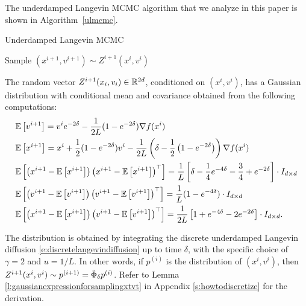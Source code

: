 The underdamped Langevin MCMC algorithm that we analyze in this paper is shown in Algorithm~\ref{ulmcmc}.

\label{algosec}\begin{algorithm}[t] \label{ulmcmc}
\caption{Underdamped Langevin MCMC} 

      {
		  Sample $(x^{i+1},v^{i+1})\sim Z^{i+1}(x^i,v^i)$
        }
   \end{algorithm} 
The random vector $Z^{i+1}(x_i,v_i)\in \mathbb{R}^{2d}$, conditioned on $(x^i,v^i)$, has a Gaussian distribution with conditional mean and covariance obtained from the following computations:
   \begin{align*}
&\mathbb{E}\left[v^{i+1}\right] = v^i e^{-2 \delta} - \frac{1}{2L}(1-e^{-2 \delta}) \nabla f(x^i)\\
&\mathbb{E}\left[x^{i+1}\right]  = x^i + \frac{1}{2}(1-e^{-2 \delta})v^i - \frac{1}{2L} \left( \delta - \frac{1}{2}\left(1-e^{-2 \delta}\right) \right) \nabla f(x^i)\\
&\mathbb{E}\left[\left(x^{i+1} - \mathbb{E}\left[x^{i+1}\right]\right) \left(x^{i+1} - \mathbb{E}\left[x^{i+1}\right]\right)^{\top}\right]= \frac{1}{L } \left[\delta-\frac{1}{4}e^{-4\delta}-\frac{3}{4}+e^{-2\delta}\right] \cdot I_{d\times d}\\
&\mathbb{E}\left[\left(v^{i+1} - \mathbb{E}\left[v^{i+1}\right]\right) \left(v^{i+1} - \mathbb{E}\left[v^{i+1}\right]\right)^{\top}\right] = \frac{1}{L}(1-e^{-4 \delta})\cdot I_{d\times d}\\
&\mathbb{E}\left[\left(x^{i+1} - \mathbb{E}\left[x^{i+1}\right]\right) \left(v^{i+1} - \mathbb{E}\left[v^{i+1}\right]\right)^{\top}\right]= \frac{1}{2L} \left[1+e^{-4\delta}-2e^{-2\delta}\right] \cdot I_{d \times d}.
\end{align*}   
   
   
   
   
The distribution is obtained by integrating the discrete underdamped Langevin diffusion \eqref{e:discretelangevindiffusion} up to time $\delta$, with the specific choice of $\gamma=2$ and $u=1/L$. In other words, if $p^{(i)}$ is the distribution of $(x^i,v^i)$, then $Z^{i+1}(x^i,v^i) \sim p^{(i+1)} = \tilde{\Phi}_{\delta} p^{(i)}$. Refer to Lemma \ref{l:gaussianexpressionforsamplingxtvt} in Appendix \ref{s:howtodiscretize} for the derivation.
   
   